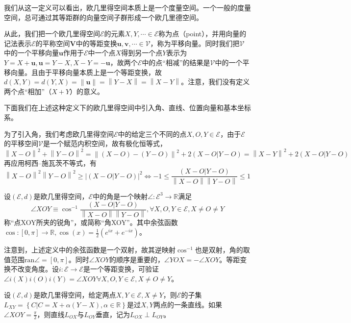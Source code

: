 \documentclass[main.tex]{subfiles}
\begin{document}
我们从这一定义可以看出，欧几里得空间本质上是一个度量空间。一个一般的度量空间，总可通过其等距群的向量空间子群形成一个欧几里德空间。

从此，我们把一个欧几里得空间$\mathcal{E}$的元素$X,Y,\cdots\in\mathcal{E}$称为点（point），并用向量的记法表示$\mathcal{E}$的平称空间$\mathbf{V}$中的等距变换$\mathbf{u},\mathbf{v},\cdots\in\mathcal{V}$，称为平移向量。同时我们把$\mathcal{V}$中的一个平移向量$\mathbf{u}$作用于$\mathcal{E}$中一个点$X$得到另一个点$Y$表示为$Y=X+\mathbf{u},\mathbf{u}=Y-X,X-Y=-\mathbf{u}$，故两个$\mathcal{E}$中的点“相减”的结果是$\mathcal{V}$中的一个平移向量。且由于平移向量本质上是一个等距变换，故$d\left(X,Y\right)=d\left(Y,X\right)=\left\|\mathbf{u}\right\|=\left\|Y-X\right\|=\left\|X-Y\right\|$。注意，我们没有定义两个点“相加”（$X+Y$）的意义。

下面我们在上述这种定义下的欧几里得空间中引入角、直线、位置向量和基本坐标系。

为了引入角，我们考虑欧几里得空间$\mathcal{E}$中的给定三个不同的点$X,O,Y\in\mathcal{E}$，由于$\mathcal{E}$的平移空间$\mathcal{V}$是一个赋范内积空间，故有极化恒等式，
\[\left\|X-O\right\|^2+\left\|Y-O\right\|^2=\left\|\left(X-O\right)-\left(Y-O\right)\right\|^2+2\left(X-O|Y-O\right)=\left\|X-Y\right\|^2+2\left(X-O|Y-O\right)\]
再应用柯西--施瓦茨不等式，有
\[\left\|X-O\right\|^2\left\|Y-O\right\|^2\geq\left|\left(X-O|Y-O\right)\right|^2\Leftrightarrow-1\leq\frac{\left(X-O|Y-O\right)}{\left\|X-O\right\|\left\|Y-O\right\|}\leq1\]

\begin{definition}[角]
设$\left(\mathcal{E},d\right)$是欧几里得空间，$\mathcal{E}$中的角是一个映射$\angle:\mathcal{E}^3\rightarrow\mathbb{R}$满足
\[\angle XOY\equiv\cos^{-1}\frac{\left(X-O|Y-O\right)}{\left\|X-O\right\|\left\|Y-O\right\|},\forall X,O,Y\in\mathcal{E},X\neq O\neq Y\]
称“点XOY所夹的锐角”，或简称“角XOY”。其中余弦函数$\cos:\left[0,\pi\right]\rightarrow\mathbb{R},\cos\left(x\right)=\frac{1}{2}\left(e^{ix}+e^{-ix}\right)$。
\end{definition}

注意到，上述定义中的余弦函数是一个双射，故其逆映射$\cos^{-1}$也是双射，角的取值范围$\mathrm{ran}\angle=\left[0,\pi\right]$。同时$\angle XOY$的顺序是重要的，$\angle YOX=-\angle XOY$。等距变换不改变角度。设$i:\mathcal{E}\rightarrow\mathcal{E}$是一个等距变换，可验证$\angle i\left(X\right)i\left(O\right)i\left(Y\right)=\angle XOY\forall X,O,Y\in\mathcal{E},X\neq O\neq Y$。

\begin{definition}[过两点的直线]
设$\left(\mathcal{E},d\right)$是欧几里得空间，给定两点$X,Y\in\mathcal{E},X\neq Y$，则$\mathcal{E}$的子集$L_{XY}=\left\{C|C=X+\alpha\left(Y-X\right),\alpha\in\mathbb{R}\right\}$是过$X,Y$两点的一条直线。如果$\angle XOY=\frac{\pi}{2}$，则直线$L_{OX}$与$L_{OY}$垂直，记为$L_{OX}\perp L_{OY}$。
\end{definition}
\end{document}
